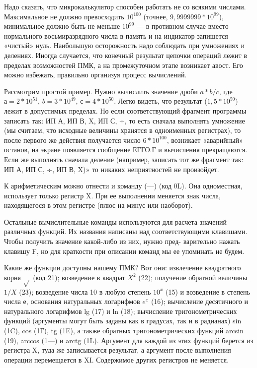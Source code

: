 \documentclass[11pt,a4paper,oneside]{article}
\begin{document}
Надо сказать, что микрокалькуля­тор способен работать не со всяки­ми числами. Максимальное не дол­жно превосходить $10^{100}$ (точнее, $9,9999999*10^{99}$), минимальное дол­жно быть не меньше $10^{99}$ — в про­тивном случае вместо нормального восьмиразрядного числа в память и на индикатор запишется «чистый» нуль. Наибольшую осторожность на­до соблюдать при умножениях и де­лениях. Иногда случается, что конеч­ный результат цепочки операций ле­жит в пределах возможностей ПМК, а на промежуточном этапе возника­ет авост. Его можно избежать, пра­вильно организуя процесс вычисле­ний.

Рассмотрим простой пример. Нуж­но вычислить значение дроби $a*b/c$, где $а=2*10^{51}$, $b=3*10^{49}$, $с=4*10^{50}$. Легко видеть, что резуль­тат ($1,5*10^{50}$) лежит в допустимых пределах. Но если соответствующий фрагмент программы записать так: ИП А, ИП В, X, ИП С, ÷, то есть сначала выполнять умножение (мы считаем, что исходные величины хра­нятся в одноименных регистрах), то после первого же действия получает­ся число $6*10^{100}$, возникает «аварий­ный» останов, на экране появляется сообщение ЕГГО.Г и вычисления прекращаются. Если же выполнять сначала деление (например, записать тот же фрагмент так: ИП А, ИП С, ÷, ИП В, X)» то никаких неприят­ностей не произойдет.

К арифметическим можно отнести и команду (—) (код 0L). Она од­номестная, использует только регистр X. При ее выполнении меняется знак числа, находящегося в этом регист­ре (плюс на минус или наоборот).

Остальные вычислительные коман­ды используются для расчета значе­ний различных функций. Их назва­ния написаны над соответствующими клавишами. Чтобы получить значе­ние какой-либо из них, нужно пред- варительно нажать клавишу F, но для краткости при описании команд мы ее упоминать не будем.

Какие же функции доступны на­шему ПМК? Вот они: извлечение квадратного корня $\sqrt{}$ (код 21);
возведение в квадрат $X^{2}$ (22); полу­чение обратной величины $1/X$ (23); возведение числа 10 в любую сте­пень $10^{x}$ (15) и возведение в степень числа е, основания натуральных логарифмов $e^{x}$ (16); вычисление де­сятичного и натурального логариф­мов lg (17) и ln (18); вычисление тригонометрических функций (аргу­менты могут быть заданы как в гра­дусах, так и в радианах) sin (1C), cos (1Г), tg (1E), а также обратных тригонометрических функций arcsin (19), arccos (1—) и arctg (1L). Ар­гумент для каждой из этих функций берется из регистра X, туда же за­писывается результат, а аргумент по­сле выполнения операции переме­щается в XI. Содержимое других ре­гистров не меняется.
\end{document}
